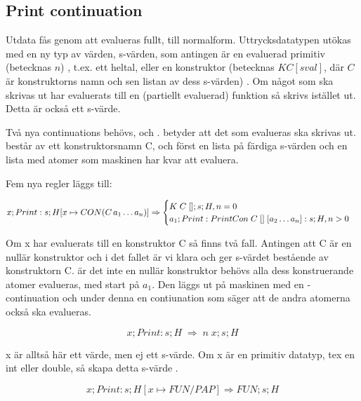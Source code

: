 \documentclass[../Appendix]{subfiles}
\begin{document}
\subsection{Print continuation}
Utdata fås genom att  evalueras fullt, till normalform. 
Uttrycksdatatypen utökas med en ny typ av värden, 
s-värden, som antingen är en evaluerad primitiv (betecknas $n$)
, t.ex. ett heltal, eller en konstruktor (betecknas $K C [sval]$, där
$C$ är konstruktorns namn och sen listan av dess s-värden) .
Om något som ska skrivas ut har evaluerats till en (partiellt evaluerad)
funktion så skrivs  istället ut. Detta är också ett s-värde.





Två nya continuations behövs,  och .
 betyder att det som evalueras ska skrivas ut.  består av ett
konstruktorsnamn C, och först en lista på färdiga s-värden och en lista med
atomer som maskinen har kvar att evaluera.

Fem nya regler läggs till:

\[
x ; Print : s ; H[x \mapsto CON(C\,a_1 \ldots a_n)]
\Rightarrow \begin{cases} 
K \; C \; [] ; s ; H , n = 0 \\
a_1 ; Print : PrintCon \; C \; [] \; [a_2 \ldots a_n] : s ; H , n > 0
\end{cases}
\]

Om x har evaluerats till en konstruktor C så finns två fall. Antingen att C är
en nullär konstruktor och i det fallet är vi klara och ger s-värdet bestående
av konstruktorn C.
    är det inte en nullär konstruktor behövs alla dess konstruerande atomer
evalueras, med start på $a_1$. Den läggs ut på maskinen med en -continuation
och under denna en contiunation som säger att de andra atomerna också ska
evalueras.
 

\[
x ; Print : s ; H \; \Rightarrow \; n \; x ; s ; H
\]

x är alltså här ett värde, men ej ett s-värde.
Om x är en primitiv datatyp, tex en int eller double, så skapa detta s-värde
.


\[
x ; Print : s ; H[x \mapsto FUN / PAP] \Rightarrow FUN ; s ; H
\]
\end{document}
